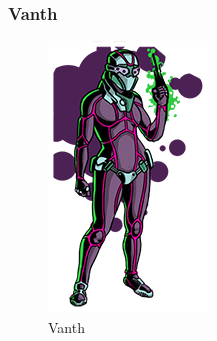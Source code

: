\documentclass[11pt]{article} %
\begin{document}
\subsubsection{Vanth}

\begin{figure}[!htp]
\centering
\includegraphics[scale=0.5]{res/characters/Vanth.png}
\caption{Vanth}
\label{Vanth}
\end{figure}
\end{document}
